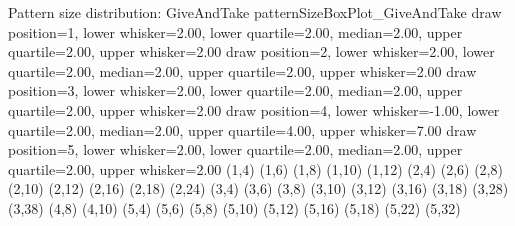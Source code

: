 \sizeBoxPlot
{Pattern size distribution: GiveAndTake}
{patternSizeBoxPlot_GiveAndTake}
{draw position=1, lower whisker=2.00, lower quartile=2.00, median=2.00, upper quartile=2.00, upper whisker=2.00}
{draw position=2, lower whisker=2.00, lower quartile=2.00, median=2.00, upper quartile=2.00, upper whisker=2.00}
{draw position=3, lower whisker=2.00, lower quartile=2.00, median=2.00, upper quartile=2.00, upper whisker=2.00}
{draw position=4, lower whisker=-1.00, lower quartile=2.00, median=2.00, upper quartile=4.00, upper whisker=7.00}
{draw position=5, lower whisker=2.00, lower quartile=2.00, median=2.00, upper quartile=2.00, upper whisker=2.00}
{(1,4) (1,6) (1,8) (1,10) (1,12) (2,4) (2,6) (2,8) (2,10) (2,12) (2,16) (2,18) (2,24) (3,4) (3,6) (3,8) (3,10) (3,12) (3,16) (3,18) (3,28) (3,38) (4,8) (4,10) (5,4) (5,6) (5,8) (5,10) (5,12) (5,16) (5,18) (5,22) (5,32) }
